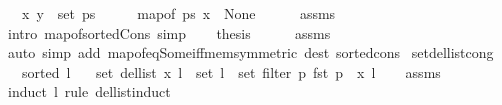 \begin{isabellebody}
\ \ \ {\isachardoublequoteopen}{\isacharparenleft}{\kern0pt}x{\isacharcomma}{\kern0pt}\ y{\isacharparenright}{\kern0pt}\ {\isasymnotin}\ set\ ps{\isachardoublequoteclose}\isanewline
%
\isadelimproof
%
\endisadelimproof
%
\isatagproof
{}\isamarkupfalse%
\ {\isacharminus}{\kern0pt}\isanewline
\ \ \isamarkupfalse%
\ {\isachardoublequoteopen}map{\isacharunderscore}{\kern0pt}of\ ps\ x\ {\isacharequal}{\kern0pt}\ None{\isachardoublequoteclose}\isanewline
\ \ \ \ \isamarkupfalse%
\ assms\isanewline
\ \ \ \ \isamarkupfalse%
\ {\isacharparenleft}{\kern0pt}intro\ map{\isacharunderscore}{\kern0pt}of{\isacharunderscore}{\kern0pt}sorted{\isacharunderscore}{\kern0pt}Cons{\isacharparenright}{\kern0pt}\ simp\isanewline
\ \ \isamarkupfalse%
\ {\isacharquery}{\kern0pt}thesis\isanewline
\ \ \ \ \isamarkupfalse%
\ assms\isanewline
\ \ \ \ \isamarkupfalse%
\ {\isacharparenleft}{\kern0pt}auto\ simp\ add{\isacharcolon}{\kern0pt}\ map{\isacharunderscore}{\kern0pt}of{\isacharunderscore}{\kern0pt}eq{\isacharunderscore}{\kern0pt}Some{\isacharunderscore}{\kern0pt}iff{\isacharunderscore}{\kern0pt}mem{\isacharbrackleft}{\kern0pt}symmetric{\isacharbrackright}{\kern0pt}\ dest{\isacharcolon}{\kern0pt}\ sorted{\isacharunderscore}{\kern0pt}cons{\isacharparenright}{\kern0pt}\isanewline
{}\isamarkupfalse%
%
\endisatagproof
{\isafoldproof}%
%
\isadelimproof
\isanewline
%
\endisadelimproof
\isanewline
\isanewline
{}\isamarkupfalse%
\ set{\isacharunderscore}{\kern0pt}del{\isacharunderscore}{\kern0pt}list{\isacharunderscore}{\kern0pt}cong{\isacharcolon}{\kern0pt}\isanewline
\ \ \ {\isachardoublequoteopen}sorted{}\ l{\isachardoublequoteclose}\isanewline
\ \ \ {\isachardoublequoteopen}set\ {\isacharparenleft}{\kern0pt}del{\isacharunderscore}{\kern0pt}list\ x\ l{\isacharparenright}{\kern0pt}\ {\isacharequal}{\kern0pt}\ set\ l\ {\isacharminus}{\kern0pt}\ set\ {\isacharparenleft}{\kern0pt}filter\ {\isacharparenleft}{\kern0pt}{\isasymlambda}p{\isachardot}{\kern0pt}\ fst\ p\ {\isacharequal}{\kern0pt}\ x{\isacharparenright}{\kern0pt}\ l{\isacharparenright}{\kern0pt}{\isachardoublequoteclose}\isanewline
%
\isadelimproof
\ \ %
\endisadelimproof
%
\isatagproof
{}\isamarkupfalse%
\ assms\isanewline
{}\isamarkupfalse%
\ {\isacharparenleft}{\kern0pt}induct\ l\ rule{\isacharcolon}{\kern0pt}\ del{\isacharunderscore}{\kern0pt}list{\isachardot}{\kern0pt}induct{\isacharparenright}{\kern0pt}\isanewline

\end{isabellebody}
